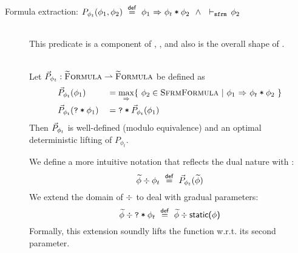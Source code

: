 \begin{description}
    \item[Formula extraction: $P_{\phi_t}(\phi_1, \phi_2) ~\overset{\textup{\textmd{\textsf{def}}}}{=}~ {\phi_1} \,\,{\Rightarrow}\,\, {\textup{\texttt{$\phi_t$\:*\:$\phi_2$}}} ~~\wedge~~ \vdash_\texttt{sfrm}\, \phi_2$]~\\
    This predicate is a component of , ,  and also is the overall shape of .
    \begin{lemma}~\\
        Let $\vec{P}_{\phi_t} : \textup{\textsc{\ensuremath{\widetilde{\text{F}}}ormula}} \rightharpoonup \textup{\textsc{\ensuremath{\widetilde{\text{F}}}ormula}}$ be defined as
        \begin{alignat*}{2}
        & \vec{P}_{\phi_t}(\phi_1)          & &= \underset{{} \,\,{\Rightarrow}\,\, {}}{\max} \{~ \phi_2 \in \textup{\textsc{SfrmFormula}} ~|~ {\phi_1} \,\,{\Rightarrow}\,\, {\textup{\texttt{$\phi_t$\:*\:$\phi_2$}}} ~\} \\
        & \vec{P}_{\phi_t}(\textup{\texttt{\textup{\texttt{?}}\:*\:\ensuremath{\phi_1}}}) & &= \textup{\texttt{\textup{\texttt{?}}\:*\:\ensuremath{\vec{P}_{\phi_t}(\phi_1)}}}
        \end{alignat*}
        Then $\vec{P}_{\phi_t}$ is well-defined (modulo equivalence) and an optimal deterministic lifting of $P_{\phi_t}$.
    \end{lemma}
    We define a more intuitive notation that reflects the dual nature with \ttt{*}:
    \begin{displaymath}
    \widetilde{\phi}\div\phi_t ~\overset{\textup{\textmd{\textsf{def}}}}{=}~ \vec{P}_{\phi_t}(\widetilde{\phi})
    \end{displaymath}
    We extend the domain of $\div$ to deal with gradual parameters:
    \begin{displaymath}
    \widetilde{\phi}\div\textup{\texttt{\textup{\texttt{?}}\:*\:\ensuremath{\phi_t}}} ~\overset{\textup{\textmd{\textsf{def}}}}{=}~ \widetilde{\phi}\div\textup{\textmd{\textsf{static($\phi$)}}}
    \end{displaymath}
    Formally, this extension soundly lifts the function w.r.t. its second parameter.
        

\end{description}
